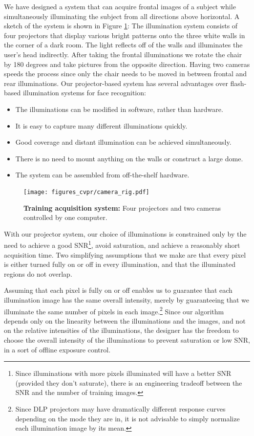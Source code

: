 \documentclass[10pt,journal,letterpaper,compsoc]{IEEEtran} %
\begin{document}
We have designed a system that can acquire frontal images of a subject while
simultaneously illuminating the subject from all directions above horizontal. A sketch of the
system is shown in Figure \ref{fig:system}: The illumination
system consists of four projectors that display various bright
patterns onto the three white walls in the corner of a dark
room.  The light reflects off of the walls and illuminates the
user's head indirectly.  After taking the frontal illuminations
we rotate the chair by 180 degrees and take pictures from the
opposite direction.  Having two cameras speeds the process
since only the chair needs to be moved in between frontal and
rear illuminations. Our projector-based system has several
advantages over flash-based illumination systems for face recognition:
\begin{itemize}
\item The illuminations can be modified in software, rather than hardware.
\item It is easy to capture many different illuminations quickly.
\item Good coverage and distant illumination can be achieved simultaneously.
\item There is no need to mount anything on the walls or construct a large dome.
\item The system can be assembled from off-the-shelf hardware.
\end{itemize}
\begin{figure}
\centerline{\hspace{-0.1in}\texttt{[image: figures\_cvpr/camera\_rig.pdf]}\vspace{0mm}}
\caption{{\bf Training acquisition system:} Four projectors and two cameras controlled by one computer.}
\vspace{-2em}
\label{fig:system}
\end{figure}
With our projector system, our choice of illuminations is
constrained only by the need to achieve a good
SNR\footnote{Since illuminations with more pixels illuminated
will have a better SNR (provided they don't saturate), there is
an engineering tradeoff between the SNR and the number of
training images.}, avoid saturation, and achieve
a reasonably short acquisition time.  Two simplifying
assumptions that we make are that every pixel is either turned
fully on or off in every illumination, and that the illuminated
regions do not overlap.

Assuming that each pixel is fully on or off enables us to guarantee
that each illumination image has the same overall intensity, merely
by guaranteeing that we illuminate the same number of pixels in each image.\footnote{Since DLP projectors may have dramatically different response
curves depending on the mode they are in, it is not advisable to simply normalize each illumination image by its mean.}
Since our algorithm depends only on  the
linearity between the illuminations and the images, and not on the
relative intensities of the illuminations, the designer has the freedom to choose the overall intensity of the illuminations
to prevent saturation or low SNR, in a sort of offline exposure control.
\end{document}
